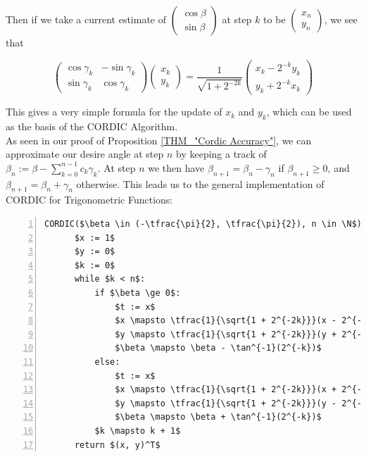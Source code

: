 {Then if we take a current estimate of \(\left(\begin{array}{c}\cos\beta\\\sin\beta\end{array}\right)\) at step \(k\) to be \(\left(\begin{array}{c}x_n\\y_n\end{array}\right)\), we see that

\begin{displaymath}
	\left(\begin{array}{cc}
		\cos\gamma_k & - \sin\gamma_k\\
		\sin\gamma_k & \cos\gamma_k
	\end{array}\right)
	\left(\begin{array}{c}
		x_k \\ y_k
	\end{array}\right)
	= \frac{1}{\sqrt{1 + 2^{-2k}}}
	\left(\begin{array}{c}
		x_k - 2^{-k}y_k\\
		y_k + 2^{-k}x_k
	\end{array}\right)
\end{displaymath}

This gives a very simple formula for the update of \(x_k\) and \(y_k\), which can be used as the basis of the CORDIC Algorithm.\\

As seen in our proof of Proposition \ref{THM_"Cordic Accuracy"}, we can approximate our desire angle at step \(n\) by keeping a track of \(\beta_n := \beta - \sum_{k=0}^{n-1}c_k\gamma_k\). At step \(n\) we then have \(\beta_{n+1} = \beta_n - \gamma_n\) if \(\beta_{n+1} \ge 0\), and \(\beta_{n+1} = \beta_n + \gamma_n\) otherwise. This leads us to the general implementation of CORDIC for Trigonometric Functions:

\begin{lstlisting}[numbers=left,frame=single,mathescape,caption={General Cordic},label={PCD_"General_Cordic"}]
  CORDIC($\beta \in (-\tfrac{\pi}{2}, \tfrac{\pi}{2}), n \in \N$):
      $x := 1$
      $y := 0$
      $k := 0$
      while $k < n$:
          if $\beta \ge 0$:
              $t := x$
              $x \mapsto \tfrac{1}{\sqrt{1 + 2^{-2k}}}(x - 2^{-k}y)$
              $y \mapsto \tfrac{1}{\sqrt{1 + 2^{-2k}}}(y + 2^{-k}t)$
              $\beta \mapsto \beta - \tan^{-1}(2^{-k})$
          else:
              $t := x$
              $x \mapsto \tfrac{1}{\sqrt{1 + 2^{-2k}}}(x + 2^{-k}y)$
              $y \mapsto \tfrac{1}{\sqrt{1 + 2^{-2k}}}(y - 2^{-k}t)$
              $\beta \mapsto \beta + \tan^{-1}(2^{-k})$
          $k \mapsto k + 1$
      return $(x, y)^T$
\end{lstlisting}

}
